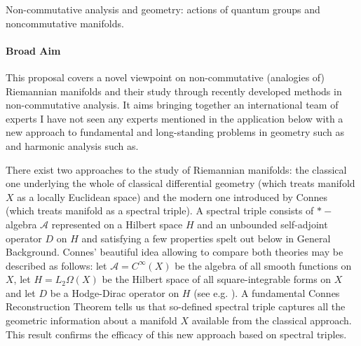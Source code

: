 \documentclass{article}
\newcommand{\archeading}[1]{\vspace{.3cm} \noindent{\bfseries #1} \vspace{.1cm}   }
\begin{document}
\parindent=20pt
\pagestyle{empty}
\newpage




\archeading{Project Title} Non-commutative analysis and geometry: actions of quantum groups and noncommutative manifolds.

\bigskip\archeading{Aims and Background}

\paragraph*{Broad Aim} This proposal covers a novel viewpoint on non-commutative (analogies of) Riemannian manifolds and their study through recently developed methods in non-commutative analysis. It aims bringing together an international team of experts {\color{red} I have not seen any experts mentioned in the application below} with a new approach to fundamental and long-standing problems in geometry {\color{red} such as} and harmonic analysis {\color{red} such as}.

There exist two approaches to the study of Riemannian manifolds: the classical one underlying the whole of classical differential geometry (which treats manifold $X$ as a locally Euclidean space) and the modern one introduced by Connes (which treats manifold as a spectral triple).  A spectral triple consists of $\ast-$algebra $\mathcal{A}$ represented on a Hilbert space $H$ and an unbounded self-adjoint operator $D$ on $H$ and satisfying a few properties spelt out below in General Background. Connes' beautiful idea \cite{Connes-book} allowing to compare both theories may be described as follows: let  $\mathcal{A}=C^{\infty}(X)$ be the algebra of all smooth functions on $X$, let $H=L_2\Omega(X)$ be the Hilbert space of all square-integrable forms on $X$ and let $D$ be a Hodge-Dirac operator on $H$ (see e.g. \cite{BGV}). A fundamental Connes Reconstruction Theorem \cite{Connes-reconstruction} tells us that so-defined spectral triple captures all the geometric information about a manifold $X$ available from the classical approach. This result confirms the efficacy of this new approach based on spectral triples.
\end{document}
